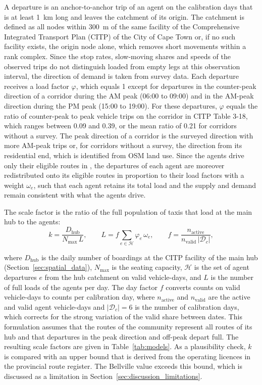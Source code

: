 A departure is an anchor-to-anchor trip of an agent on the calibration days that is at least 1~km long and leaves the catchment of its origin. The catchment is defined as all nodes within 300~m of the same facility of the Comprehensive Integrated Transport Plan (CITP) of the City of Cape Town or, if no such facility exists, the origin node alone, which removes short movements within a rank complex. Since the stop rates, slow-moving shares and speeds of the observed trips do not distinguish loaded from empty legs at this observation interval, the direction of demand is taken from survey data. Each departure receives a load factor \( \varphi \), which equals 1 except for departures in the counter-peak direction of a corridor during the AM peak (06:00 to 09:00) and in the AM-peak direction during the PM peak (15:00 to 19:00). For these departures, \( \varphi \) equals the ratio of counter-peak to peak vehicle trips on the corridor in CITP Table 3-18, which ranges between 0.09 and 0.39, or the mean ratio of 0.21 for corridors without a survey. The peak direction of a corridor is the surveyed direction with more AM-peak trips or, for corridors without a survey, the direction from its residential end, which is identified from OSM land use. Since the agents drive only their eligible routes in \MA, the departures of each agent are moreover redistributed onto its eligible routes in proportion to their load factors with a weight \( \omega_e \), such that each agent retains its total load and the supply and demand remain consistent with what the agents drive.

The scale factor is the ratio of the full population of taxis that load at the main hub to the agents:
\begin{equation}
    k = \frac{D_\mathrm{hub}}{N_{\text{max}}\,L}, \qquad L = f \sum_{e \in \mathcal{H}} \varphi_e\, \omega_e, \qquad f = \frac{n_{\text{active}}}{n_{\text{valid}}\,\lvert \mathcal{D}_c \rvert},
\end{equation}

\noindent where \( D_\mathrm{hub} \) is the daily number of boardings at the CITP facility of the main hub (Section~\ref{sec:spatial_data}), \( N_{\text{max}} \) is the seating capacity, \( \mathcal{H} \) is the set of agent departures \( e \) from the hub catchment on valid vehicle-days, and \( L \) is the number of full loads of the agents per day. The day factor \( f \) converts counts on valid vehicle-days to counts per calibration day, where \( n_{\text{active}} \) and \( n_{\text{valid}} \) are the active and valid agent vehicle-days and \( \lvert \mathcal{D}_c \rvert = 6 \) is the number of calibration days, which corrects for the strong variation of the valid share between dates. This formulation assumes that the routes of the community represent all routes of its hub and that departures in the peak direction and off-peak depart full. The resulting scale factors are given in Table~\ref{tab:models}. As a plausibility check, \( k \) is compared with an upper bound that is derived from the operating licences in the provincial route register. The Bellville value exceeds this bound, which is discussed as a limitation in Section~\ref{sec:discussion_limitations}.

